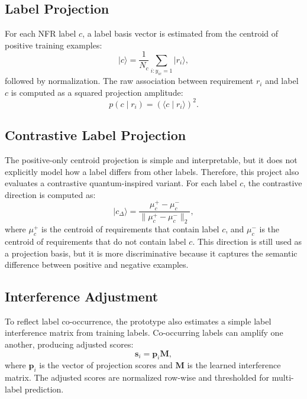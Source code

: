 \documentclass[conference]{IEEEtran}
\begin{document}
\subsection{Label Projection}
For each NFR label $c$, a label basis vector is estimated from the centroid of positive training examples:
\begin{equation}
    \lvert c \rangle = \frac{1}{N_c}\sum_{i:y_{ic}=1}\lvert r_i \rangle,
\end{equation}
followed by normalization. The raw association between requirement $r_i$ and label $c$ is computed as a squared projection amplitude:
\begin{equation}
    p(c \mid r_i) = \left(\langle c \mid r_i \rangle\right)^2.
\end{equation}

\subsection{Contrastive Label Projection}
The positive-only centroid projection is simple and interpretable, but it does not explicitly model how a label differs from other labels. Therefore, this project also evaluates a contrastive quantum-inspired variant. For each label $c$, the contrastive direction is computed as:
\begin{equation}
    \lvert c_{\Delta} \rangle =
    \frac{\mu_c^{+} - \mu_c^{-}}
    {\lVert \mu_c^{+} - \mu_c^{-} \rVert_2},
\end{equation}
where $\mu_c^{+}$ is the centroid of requirements that contain label $c$, and $\mu_c^{-}$ is the centroid of requirements that do not contain label $c$. This direction is still used as a projection basis, but it is more discriminative because it captures the semantic difference between positive and negative examples.

\subsection{Interference Adjustment}
To reflect label co-occurrence, the prototype also estimates a simple label interference matrix from training labels. Co-occurring labels can amplify one another, producing adjusted scores:
\begin{equation}
    \mathbf{s}_i = \mathbf{p}_i \mathbf{M},
\end{equation}
where $\mathbf{p}_i$ is the vector of projection scores and $\mathbf{M}$ is the learned interference matrix. The adjusted scores are normalized row-wise and thresholded for multi-label prediction.
\end{document}
